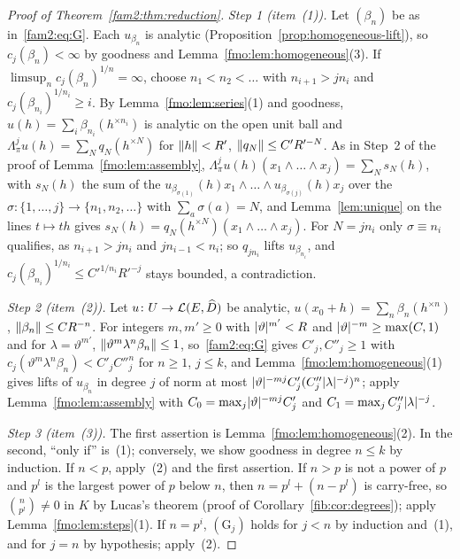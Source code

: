 \begin{proof}[Proof of Theorem~\ref{fam2:thm:reduction}]
\emph{Step 1 (item~(1)).} Let $(\beta_n)$ be as in~\eqref{fam2:eq:G}. Each $u_{\beta_n}$ is analytic
(Proposition~\ref{prop:homogeneous-lift}), so $c_j(\beta_n)<\infty$ by goodness and Lemma~\ref{fmo:lem:homogeneous}(3). If
$\limsup_nc_j(\beta_n)^{1/n}=\infty$, choose $n_1<n_2<\dots$ with $n_{i+1}>jn_i$ and $c_j(\beta_{n_i})^{1/n_i}\ge i$. By
Lemma~\ref{fmo:lem:series}(1) and goodness, $u(h)=\sum_i\beta_{n_i}(h^{\times n_i})$ is analytic on the open unit ball and
$\Lambda^j_\pi u(h)=\sum_Nq_N(h^{\times N})$ for $\lVert h\rVert<R'$, $\lVert q_N\rVert\le C'R'^{-N}$. As in Step~2 of the proof of
Lemma~\ref{fmo:lem:assembly}, $\Lambda^j_\pi u(h)(x_1\wedge\dots\wedge x_j)=\sum_Ns_N(h)$, with $s_N(h)$ the sum of the
$u_{\beta_{\sigma(1)}}(h)x_1\wedge\dots\wedge u_{\beta_{\sigma(j)}}(h)x_j$ over the $\sigma\colon\{1,\dots,j\}\to
\{n_1,n_2,\dots\}$ with $\sum_a\sigma(a)=N$, and Lemma~\ref{lem:unique} on the lines $t\mapsto th$ gives
$s_N(h)=q_N(h^{\times N})(x_1\wedge\dots\wedge x_j)$. For $N=jn_i$ only $\sigma\equiv n_i$ qualifies, as $n_{i+1}>jn_i$
and $jn_{i-1}<n_i$; so $q_{jn_i}$ lifts $u_{\beta_{n_i}}$, and $c_j(\beta_{n_i})^{1/n_i}\le C'^{1/n_i}R'^{-j}$ stays
bounded, a contradiction.

\emph{Step 2 (item~(2)).} Let $u\colon U\to\mathcal L(E,\widehat D)$ be analytic, $u(x_0+h)=\sum_n\beta_n(h^{\times n})$,
$\lVert \beta_n\rVert\le CR^{-n}$. For integers $m,m'\ge0$ with $\lvert \vartheta\rvert^{m'}<R$ and $\lvert \vartheta\rvert^{-m}\ge\max(C,1)$ and for
$\lambda=\vartheta^{m'}$, $\lVert \vartheta^m\lambda^n\beta_n\rVert\le1$, so~\eqref{fam2:eq:G} gives $C'_j,C''_j\ge1$ with
$c_j(\vartheta^m\lambda^n\beta_n)<C'_jC''^n_j$ for $n\ge1$, $j\le k$, and Lemma~\ref{fmo:lem:homogeneous}(1) gives lifts of
$u_{\beta_n}$ in degree $j$ of norm at most $\lvert \vartheta\rvert^{-mj}C'_j(C''_j\lvert \lambda\rvert^{-j})^n$; apply
Lemma~\ref{fmo:lem:assembly} with $C_0=\max_j\lvert \vartheta\rvert^{-mj}C'_j$ and $C_1=\max_jC''_j\lvert \lambda\rvert^{-j}$.

\emph{Step 3 (item~(3)).} The first assertion is Lemma~\ref{fmo:lem:homogeneous}(2). In the second, ``only if'' is~(1);
conversely, we show goodness in degree $n\le k$ by induction. If $n<p$, apply~(2) and the first assertion. If $n>p$ is not
a power of $p$ and $p^l$ is the largest power of $p$ below $n$, then $n=p^l+(n-p^l)$ is carry-free, so $\binom n{p^l}\ne0$
in $K$ by Lucas's theorem (proof of Corollary~\ref{fib:cor:degrees}); apply Lemma~\ref{fmo:lem:steps}(1). If $n=p^i$,
$(\mathrm G_j)$ holds for $j<n$ by induction and~(1), and for $j=n$ by hypothesis; apply~(2).


\end{proof}
